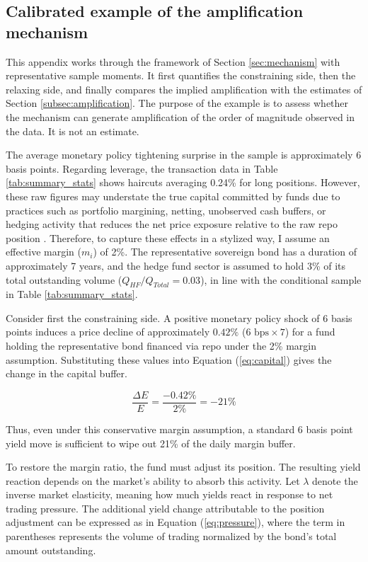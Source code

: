 \documentclass[english, 11pt, oneside]{article}
\begin{document}
\begin{table}[h!]
\end{table}


\clearpage
\subsection{Calibrated example of the amplification mechanism}
\label{subsec:calibration}

This appendix works through the framework of Section \ref{sec:mechanism} with representative sample moments. It first quantifies the constraining side, then the relaxing side, and finally compares the implied amplification with the estimates of Section \ref{subsec:amplification}. The purpose of the example is to assess whether the mechanism can generate amplification of the order of magnitude observed in the data. It is not an estimate.

The average monetary policy tightening surprise in the sample is approximately 6 basis points. Regarding leverage, the transaction data in Table \ref{tab:summary_stats} shows haircuts averaging 0.24\% for long positions. However, these raw figures may understate the true capital committed by funds due to practices such as portfolio margining, netting, unobserved cash buffers, or hedging activity that reduces the net price exposure relative to the raw repo position \citep{hempel2023, hill2025, hermes2025a}. Therefore, to capture these effects in a stylized way, I assume an effective margin ($m_i$) of 2\%. The representative sovereign bond has a duration of approximately 7 years, and the hedge fund sector is assumed to hold 3\% of its total outstanding volume ($Q_{HF}/Q_{Total} = 0.03$), in line with the conditional sample in Table \ref{tab:summary_stats}.

Consider first the constraining side. A positive monetary policy shock of 6 basis points induces a price decline of approximately $0.42\%$ ($6\text{ bps} \times 7$) for a fund holding the representative bond financed via repo under the 2\% margin assumption. Substituting these values into Equation (\ref{eq:capital}) gives the change in the capital buffer.

\begin{equation*}
\frac{\Delta E}{E} = \frac{-0.42\%}{2\%} = -21\%
\end{equation*}

Thus, even under this conservative margin assumption, a standard 6 basis point yield move is sufficient to wipe out 21\% of the daily margin buffer.

To restore the margin ratio, the fund must adjust its position. The resulting yield reaction depends on the market's ability to absorb this activity. Let $\lambda$ denote the inverse market elasticity, meaning how much yields react in response to net trading pressure. The additional yield change attributable to the position adjustment can be expressed as in Equation (\ref{eq:pressure}), where the term in parentheses represents the volume of trading normalized by the bond's total amount outstanding.
\end{document}
